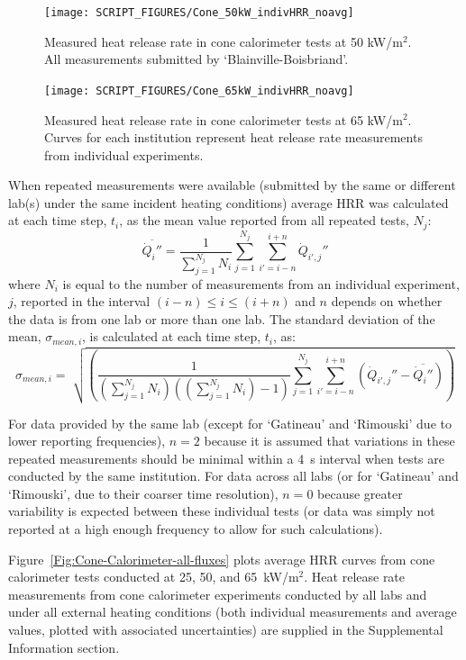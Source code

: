 \documentclass{book}
\begin{document}
\begin{figure}
  \centering
  \texttt{[image: SCRIPT\_FIGURES/Cone\_50kW\_indivHRR\_noavg]}
  \caption{Measured heat release rate in cone calorimeter tests at 50 kW/m$^2$. All measurements submitted by ‘Blainville-Boisbriand’.}
  \label{Fig:Cone_50kWindivHRR}
\end{figure}

\begin{figure}
  \centering
  \texttt{[image: SCRIPT\_FIGURES/Cone\_65kW\_indivHRR\_noavg]}
  \caption{Measured heat release rate in cone calorimeter tests at 65 kW/m$^2$. Curves for each institution represent heat release rate measurements from individual experiments.}
  \label{Fig:Cone_65kWindivHRR}
\end{figure}

When repeated measurements were available (submitted by the same or different lab(s) under the same incident heating conditions) average HRR was calculated at each time step, $t_i$, as the mean value reported from all repeated tests, $N_j$:
\begin{equation}
  \overline{\dot{Q}_i''} = \frac{1}{\sum_{j=1}^{N_j}N_i} \sum_{j=1}^{N_j} \sum_{i'=i-n}^{i+n} \dot{Q}_{i',j}''
\end{equation}
where $N_i$ is equal to the number of measurements from an individual experiment, $j$, reported in the interval $(i-n) \leq i \leq (i+n)$ and $n$ depends on whether the data is from one lab or more than one lab. The standard deviation of the mean, $\sigma_{mean,i}$, is calculated at each time step, $t_i$, as:
\begin{equation}
   \sigma_{mean,i} = \sqrt[]{\left(\frac{1}{(\sum_{j=1}^{N_j}N_i)((\sum_{j=1}^{N_j}N_i)-1)}   \sum_{j=1}^{N_j} \sum_{i'=i-n}^{i+n} \left( \dot{Q}_{i',j}'' - \overline{\dot{Q}_i''} \right)\right)}
\end{equation}

For data provided by the same lab (except for ‘Gatineau’ and ‘Rimouski’ due to lower reporting frequencies), $n=2$ because it is assumed that variations in these repeated measurements should be minimal within a 4~s interval when tests are conducted by the same institution. For data across all labs (or for ‘Gatineau’ and ‘Rimouski’, due to their coarser time resolution), $n=0$ because greater variability is expected between these individual tests (or data was simply not reported at a high enough frequency to allow for such calculations).


Figure~\ref{Fig:Cone-Calorimeter-all-fluxes} plots average HRR curves from cone calorimeter tests conducted at 25, 50, and 65~kW/m$^2$. Heat release rate measurements from cone calorimeter experiments conducted by all labs and under all external heating conditions (both individual measurements and average values, plotted with associated uncertainties) are supplied in the Supplemental Information section.
\end{document}
